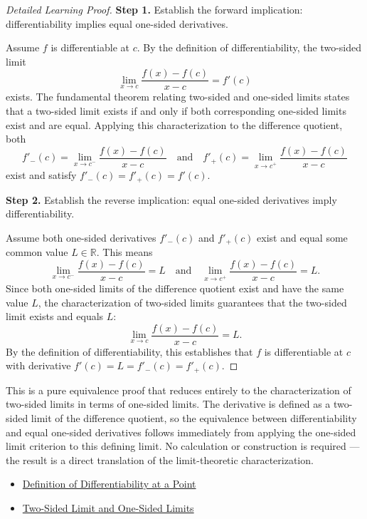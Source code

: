 \begin{proof}[Detailed Learning Proof]
\LRAProofBodyStart

\textbf{Step 1.} Establish the forward implication: differentiability implies equal one-sided derivatives.

Assume $f$ is differentiable at $c$. By the definition of differentiability, the two-sided limit
\[
\lim_{x \to c} \frac{f(x) - f(c)}{x - c} = f'(c)
\]
exists. The fundamental theorem relating two-sided and one-sided limits states that a two-sided limit exists if and only if both corresponding one-sided limits exist and are equal. Applying this characterization to the difference quotient, both
\[
f'_-(c) = \lim_{x \to c^-} \frac{f(x) - f(c)}{x - c} \quad \text{and} \quad f'_+(c) = \lim_{x \to c^+} \frac{f(x) - f(c)}{x - c}
\]
exist and satisfy $f'_-(c) = f'_+(c) = f'(c)$.

\textbf{Step 2.} Establish the reverse implication: equal one-sided derivatives imply differentiability.

Assume both one-sided derivatives $f'_-(c)$ and $f'_+(c)$ exist and equal some common value $L \in \mathbb{R}$. This means
\[
\lim_{x \to c^-} \frac{f(x) - f(c)}{x - c} = L \quad \text{and} \quad \lim_{x \to c^+} \frac{f(x) - f(c)}{x - c} = L.
\]
Since both one-sided limits of the difference quotient exist and have the same value $L$, the characterization of two-sided limits guarantees that the two-sided limit exists and equals $L$:
\[
\lim_{x \to c} \frac{f(x) - f(c)}{x - c} = L.
\]
By the definition of differentiability, this establishes that $f$ is differentiable at $c$ with derivative $f'(c) = L = f'_-(c) = f'_+(c)$.
\end{proof}

\begin{remark*}
This is a pure equivalence proof that reduces entirely to the characterization of two-sided limits in terms of one-sided limits. The derivative is defined as a two-sided limit of the difference quotient, so the equivalence between differentiability and equal one-sided derivatives follows immediately from applying the one-sided limit criterion to this defining limit. No calculation or construction is required --- the result is a direct translation of the limit-theoretic characterization.
\end{remark*}

\begin{dependencies}
\begin{itemize}
  \item \hyperref[def:derivative-at-a-point]{Definition of Differentiability at a Point}
  \item \hyperref[thm:two-sided-limit-iff-matching-one-sided-limits]{Two-Sided Limit and One-Sided Limits}
\end{itemize}
\end{dependencies}

\clearpage

